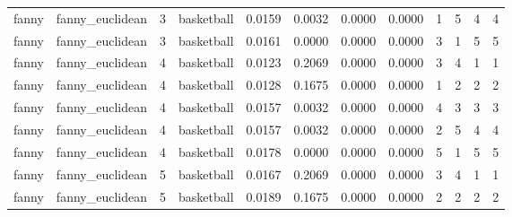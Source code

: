 \documentclass[
]{article}
\begin{document}
\begin{longtable}{| p{1.1cm} | p{2cm} | p{0.8cm} | p{1.3cm} | p{0.60cm} | p{0.7cm} | p{0.65cm} | p{0.65cm} | p{0.65cm} | p{0.65cm} | p{0.7cm} | p{0.65cm} |}
\scriptsize   fanny   & \scriptsize  fanny\_euclidean & \scriptsize    3    & \scriptsize basketball & \scriptsize    0.0159  &  \scriptsize 0.0032 & \scriptsize 0.0000 & \scriptsize    0.0000 & \scriptsize   1  & \scriptsize    5  & \scriptsize    4  & \scriptsize    4 \\
\scriptsize   fanny   & \scriptsize  fanny\_euclidean & \scriptsize    3    & \scriptsize basketball & \scriptsize    0.0161  &  \scriptsize 0.0000 & \scriptsize 0.0000 & \scriptsize    0.0000 & \scriptsize   3  & \scriptsize    1  & \scriptsize    5  & \scriptsize    5 \\
\cline{3-12}
\scriptsize   fanny   & \scriptsize  fanny\_euclidean & \scriptsize    4    & \scriptsize basketball & \scriptsize    0.0123  &  \scriptsize 0.2069 & \scriptsize 0.0000 & \scriptsize    0.0000 & \scriptsize   3  & \scriptsize    4  & \scriptsize    1  & \scriptsize    1 \\
\scriptsize   fanny   & \scriptsize  fanny\_euclidean & \scriptsize    4    & \scriptsize basketball & \scriptsize    0.0128  &  \scriptsize 0.1675 & \scriptsize 0.0000 & \scriptsize    0.0000 & \scriptsize   1  & \scriptsize    2  & \scriptsize    2  & \scriptsize    2 \\
\scriptsize   fanny   & \scriptsize  fanny\_euclidean & \scriptsize    4    & \scriptsize basketball & \scriptsize    0.0157  &  \scriptsize 0.0032 & \scriptsize 0.0000 & \scriptsize    0.0000 & \scriptsize   4  & \scriptsize    3  & \scriptsize    3  & \scriptsize    3 \\
\scriptsize   fanny   & \scriptsize  fanny\_euclidean & \scriptsize    4    & \scriptsize basketball & \scriptsize    0.0157  &  \scriptsize 0.0032 & \scriptsize 0.0000 & \scriptsize    0.0000 & \scriptsize   2  & \scriptsize    5  & \scriptsize    4  & \scriptsize    4 \\
\scriptsize   fanny   & \scriptsize  fanny\_euclidean & \scriptsize    4    & \scriptsize basketball & \scriptsize    0.0178  &  \scriptsize 0.0000 & \scriptsize 0.0000 & \scriptsize    0.0000 & \scriptsize   5  & \scriptsize    1  & \scriptsize    5  & \scriptsize    5 \\
\cline{3-12}
\scriptsize   fanny   & \scriptsize  fanny\_euclidean & \scriptsize    5    & \scriptsize basketball & \scriptsize    0.0167  &  \scriptsize 0.2069 & \scriptsize 0.0000 & \scriptsize    0.0000 & \scriptsize   3  & \scriptsize    4  & \scriptsize    1  & \scriptsize    1 \\
\scriptsize   fanny   & \scriptsize  fanny\_euclidean & \scriptsize    5    & \scriptsize basketball & \scriptsize    0.0189  &  \scriptsize 0.1675 & \scriptsize 0.0000 & \scriptsize    0.0000 & \scriptsize   2  & \scriptsize    2  & \scriptsize    2  & \scriptsize    2 \\

\end{longtable}
\end{document}
